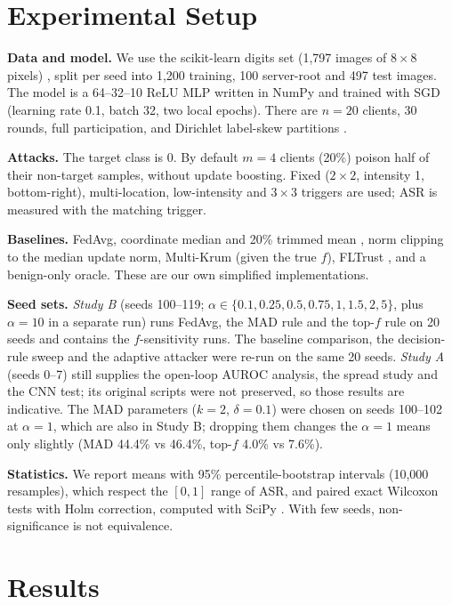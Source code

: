 \section{Experimental Setup}
\textbf{Data and model.} We use the scikit-learn digits set (1,797 images of $8{\times}8$ pixels) \cite{pedregosa2011}, split per seed into 1,200 training, 100 server-root and 497 test images. The model is a 64--32--10 ReLU MLP written in NumPy \cite{harris2020} and trained with SGD (learning rate 0.1, batch 32, two local epochs). There are $n=20$ clients, 30 rounds, full participation, and Dirichlet label-skew partitions \cite{li2022niid}.

\textbf{Attacks.} The target class is 0. By default $m=4$ clients (20\%) poison half of their non-target samples, without update boosting. Fixed ($2{\times}2$, intensity 1, bottom-right), multi-location, low-intensity and $3{\times}3$ triggers are used; ASR is measured with the matching trigger.

\textbf{Baselines.} FedAvg, coordinate median and 20\% trimmed mean \cite{yin2018}, norm clipping to the median update norm, Multi-Krum \cite{blanchard2017} (given the true $f$), FLTrust \cite{cao2021}, and a benign-only oracle. These are our own simplified implementations.

\textbf{Seed sets.} \emph{Study B} (seeds 100--119; $\alpha\in\{0.1,0.25,0.5,0.75,1,1.5,2,5\}$, plus $\alpha=10$ in a separate run) runs FedAvg, the MAD rule and the top-$f$ rule on 20 seeds and contains the $f$-sensitivity runs. The baseline comparison, the decision-rule sweep and the adaptive attacker were re-run on the same 20 seeds. \emph{Study A} (seeds 0--7) still supplies the open-loop AUROC analysis, the spread study and the CNN test; its original scripts were not preserved, so those results are indicative. The MAD parameters ($k{=}2$, $\delta{=}0.1$) were chosen on seeds 100--102 at $\alpha=1$, which are also in Study B; dropping them changes the $\alpha=1$ means only slightly (MAD 44.4\% vs 46.4\%, top-$f$ 4.0\% vs 7.6\%).

\textbf{Statistics.} We report means with 95\% percentile-bootstrap intervals (10,000 resamples), which respect the $[0,1]$ range of ASR, and paired exact Wilcoxon tests with Holm correction, computed with SciPy \cite{virtanen2020}. With few seeds, non-significance is not equivalence.

\section{Results}
